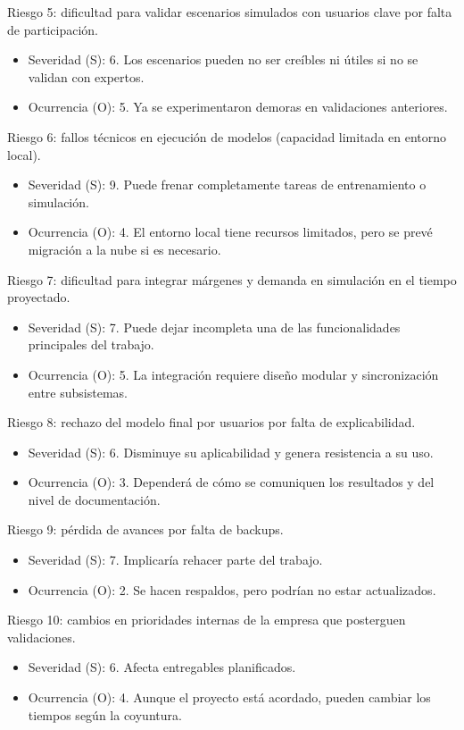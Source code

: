 \documentclass[
11pt, %
]{charter}
\begin{document}
Riesgo 5: dificultad para validar escenarios simulados con usuarios clave por falta de participación.
\begin{itemize}
	\item Severidad (S):  6. Los escenarios pueden no ser creíbles ni útiles si no se validan con expertos.
	\item Ocurrencia (O): 5. Ya se experimentaron demoras en validaciones anteriores.
\end{itemize}

Riesgo 6: fallos técnicos en ejecución de modelos (capacidad limitada en entorno local).
\begin{itemize}
	\item Severidad (S): 9. Puede frenar completamente tareas de entrenamiento o simulación.
	\item Ocurrencia (O): 4. El entorno local tiene recursos limitados, pero se prevé migración a la nube si es necesario.
\end{itemize}

Riesgo 7: dificultad para integrar márgenes y demanda en simulación en el tiempo proyectado.
\begin{itemize}
	\item Severidad (S):  7. Puede dejar incompleta una de las funcionalidades principales del trabajo.
	\item Ocurrencia (O): 5. La integración requiere diseño modular y sincronización entre subsistemas.
\end{itemize}

Riesgo 8: rechazo del modelo final por usuarios por falta de explicabilidad.
\begin{itemize}
	\item Severidad (S):  6. Disminuye su aplicabilidad y genera resistencia a su uso.
	\item Ocurrencia (O): 3. Dependerá de cómo se comuniquen los resultados y del nivel de documentación.
\end{itemize}

Riesgo 9: pérdida de avances por falta de backups.
\begin{itemize}
	\item Severidad (S):  7. Implicaría rehacer parte del trabajo.
	\item Ocurrencia (O): 2. Se hacen respaldos, pero podrían no estar actualizados.
\end{itemize}

Riesgo 10: cambios en prioridades internas de la empresa que posterguen validaciones.
\begin{itemize}
	\item Severidad (S):  6. Afecta entregables planificados.
	\item Ocurrencia (O): 4. Aunque el proyecto está acordado, pueden cambiar los tiempos según la coyuntura.
\end{itemize}
\end{document}
